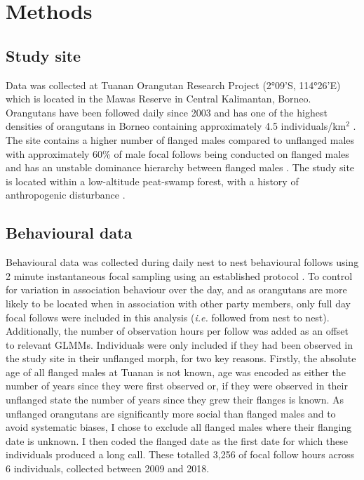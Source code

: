 \section{Methods}
\subsection{Study site}
Data was collected at Tuanan Orangutan Research Project (2°09'S, 114°26'E) which is located in the Mawas Reserve in Central Kalimantan, Borneo. Orangutans have been followed daily since 2003 and has one of the highest densities of orangutans in Borneo containing approximately 4.5 individuals/km$^{2}$ \citep{Husson.2008}. The site contains a higher number of flanged males compared to unflanged males with approximately 60\% of male focal follows being conducted on flanged males and has an unstable dominance hierarchy between flanged males \citep{Dunkel.2013}. The study site is located within a low-altitude peat-swamp forest, with a history of anthropogenic disturbance \citep{Gaveau.2014}.


\subsection{Behavioural data}
Behavioural data was collected during daily nest to nest behavioural follows using 2 minute instantaneous focal sampling using an established protocol \citep{OU_methods}. To control for variation in association behaviour over the day, and as orangutans are more likely to be located when in association with other party members, only full day focal follows were included in this analysis (\textit{i.e.} followed from nest to nest). Additionally, the number of observation hours per follow was added as an offset to relevant GLMMs. Individuals were only included if they had been observed in the study site in their unflanged morph, for two key reasons. Firstly, the absolute age of all flanged males at Tuanan is not known, age was encoded as either the number of years since they were first observed or, if they were observed in their unflanged state the number of years since they grew their flanges is known. As unflanged orangutans are significantly more social than flanged males and to avoid systematic biases, I chose to exclude all flanged males where their flanging date is unknown. I then coded the flanged date as the first date for which these individuals produced a long call. These totalled 3,256 of focal follow hours across 6 individuals, collected between 2009 and 2018. 

